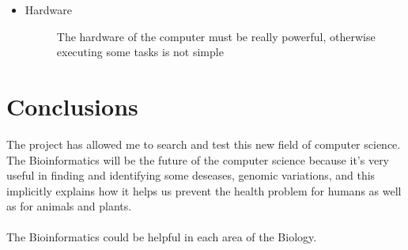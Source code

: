 \begin{itemize}
\item \begin{description}
		\item[Hardware] The hardware of the computer must be really powerful, otherwise executing some tasks is not simple
  \end{description}
\end{itemize}

\section{Conclusions}
The project has allowed me to search and test this new field of computer science.
The Bioinformatics will be the future of the computer science because it's very useful in finding and identifying some deseases, genomic variations, and this implicitly explains how it helps us prevent the health problem for humans as well as for animals and plants.\\\\
The Bioinformatics could be helpful in each area of the Biology.